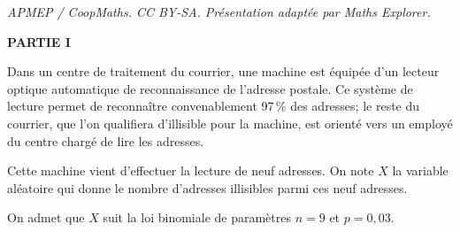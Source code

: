 \documentclass[10pt]{article}
\begin{document}
\noindent\textit{APMEP / CoopMaths. CC BY-SA. Présentation adaptée par Maths Explorer.}\par\medskip
\medskip





\textbf{PARTIE I}

\medskip

Dans un centre de traitement du courrier, une machine est équipée d'un lecteur optique automatique de reconnaissance de l'adresse postale. Ce système de lecture permet de reconnaître convenablement 97\,\% des adresses; le reste du courrier, que l'on qualifiera d'illisible pour la machine, est orienté vers un employé du centre chargé de lire les adresses. 

Cette machine vient d'effectuer la lecture de neuf adresses. On note $X$ la variable aléatoire qui donne le nombre d'adresses illisibles parmi ces neuf adresses.

On admet que $X$ suit la loi binomiale de paramètres $n = 9$ et $p = 0,03$.

\medskip
\end{document}
